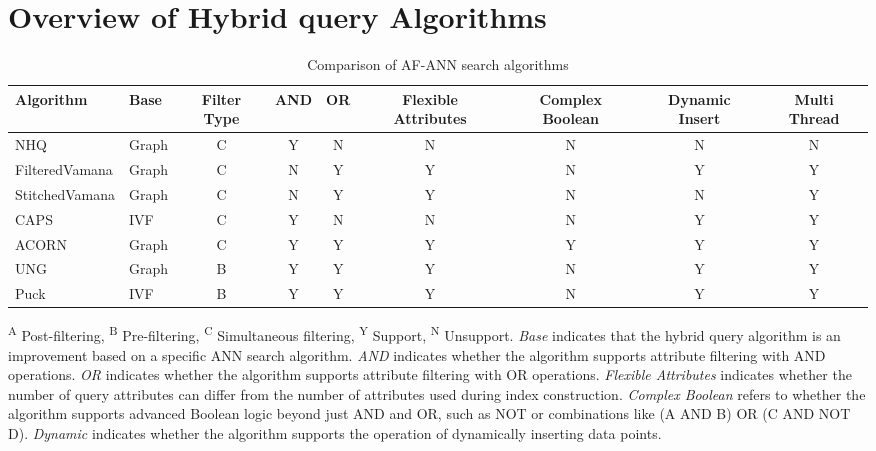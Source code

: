 \documentclass[sigconf, nonacm]{acmart}
\begin{document}
\section{Overview of Hybrid query Algorithms}

\setlength{\textfloatsep}{0cm}
\setlength{\floatsep}{0cm}
\begin{table}[t]
	\centering
        \setlength{\abovecaptionskip}{0.05cm}
        
	\caption{Comparison of AF-ANN search algorithms}
	\small
	\label{tab:compair_1}
    \begin{tabular}{|l|l|c|c|c|c|c|c|c|}
		\hline
        \textbf{Algorithm} & \textbf{Base} & \textbf{Filter Type} & \textbf{AND} & \textbf{OR} & \textbf{Flexible Attributes} & \textbf{Complex Boolean} & \textbf{Dynamic Insert} & \textbf{Multi Thread} \\
		\hline
         NHQ & Graph & C & Y & N& N& N & N & N \\
         FilteredVamana & Graph & C & N & Y & Y & N & Y & Y \\
	StitchedVamana & Graph & C & N & Y & Y & N & N & Y  \\
        CAPS & IVF & C & Y & N & N & N & Y & Y \\
        ACORN & Graph & C & Y & Y & Y & Y & Y & Y \\
       UNG & Graph & B & Y & Y & Y & N & Y & Y \\ 
        Puck & IVF & B & Y & Y & Y & N & Y & Y \\
		
		\hline
	\end{tabular}

    \vspace{0.2em}
	\centering
    \footnotesize{
	\begin{minipage}{\linewidth}
		\textsuperscript{A} Post-filtering, 
		\textsuperscript{B} Pre-filtering, 
		\textsuperscript{C} Simultaneous filtering, 
		\textsuperscript{Y} Support, 
		\textsuperscript{N} Unsupport. 
		\textit{Base} indicates that the hybrid query algorithm is an improvement based on a specific ANN search algorithm. 
		\textit{AND} indicates whether the algorithm supports attribute filtering with AND operations. 
		\textit{OR} indicates whether the algorithm supports attribute filtering with OR operations. 
		\textit{Flexible Attributes} indicates whether the number of query attributes can differ from the number of attributes used during index construction. 
		\textit{Complex Boolean} refers to whether the algorithm supports advanced Boolean logic beyond just AND and OR, such as NOT or combinations like (A AND B) OR (C AND NOT D). 
		\textit{Dynamic} indicates whether the algorithm supports the operation of dynamically inserting data points.
	\end{minipage}}
    \vspace{-0.5cm}
\end{table}
\end{document}
